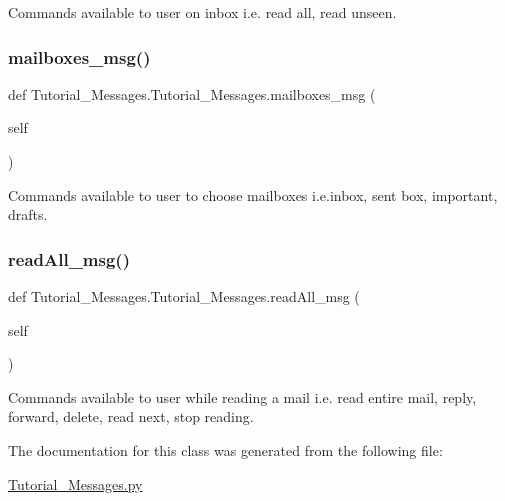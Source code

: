 Commands available to user on inbox i.\+e. read all, read unseen. \mbox{\label{classTutorial__Messages_1_1Tutorial__Messages_a0d0b3b3ad8cf3487db7777b84d3308ad}} 
\subsubsection{\texorpdfstring{mailboxes\+\_\+msg()}{mailboxes\_msg()}}
{\footnotesize\ttfamily def Tutorial\+\_\+\+Messages.\+Tutorial\+\_\+\+Messages.\+mailboxes\+\_\+msg (\begin{DoxyParamCaption}\item[{}]{self }\end{DoxyParamCaption})}

Commands available to user to choose mailboxes i.\+e.\+inbox, sent box, important, drafts. \mbox{\label{classTutorial__Messages_1_1Tutorial__Messages_ac48237f5f93e3447b709b020707a3911}} 
\subsubsection{\texorpdfstring{read\+All\+\_\+msg()}{readAll\_msg()}}
{\footnotesize\ttfamily def Tutorial\+\_\+\+Messages.\+Tutorial\+\_\+\+Messages.\+read\+All\+\_\+msg (\begin{DoxyParamCaption}\item[{}]{self }\end{DoxyParamCaption})}

Commands available to user while reading a mail i.\+e. read entire mail, reply, forward, delete, read next, stop reading. 

The documentation for this class was generated from the following file\+:\begin{DoxyCompactItemize}
\item 
\hyperlink{Tutorial__Messages_8py}{Tutorial\+\_\+\+Messages.\+py}\end{DoxyCompactItemize}
